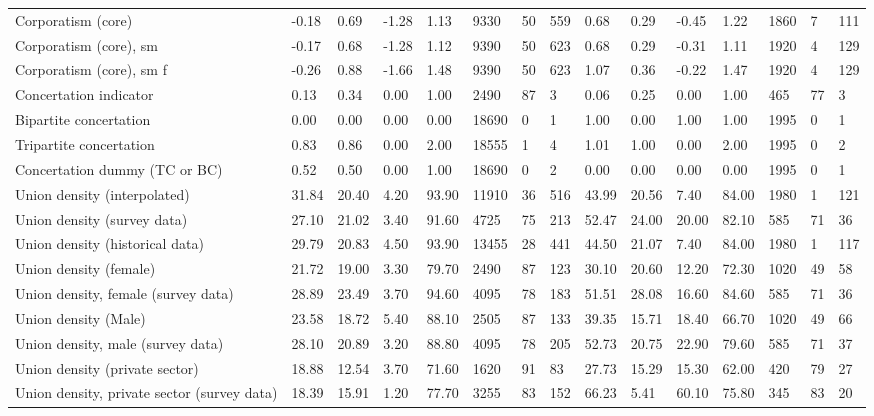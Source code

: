 \begin{longtable}{lllllllllllllll}
Corporatism (core) & -0.18 & 0.69 & -1.28 & 1.13 & 9330 & 50 & 559 & 0.68 & 0.29 & -0.45 & 1.22 & 1860 & 7 & 111\\
\addlinespace
Corporatism (core), sm & -0.17 & 0.68 & -1.28 & 1.12 & 9390 & 50 & 623 & 0.68 & 0.29 & -0.31 & 1.11 & 1920 & 4 & 129\\
Corporatism (core), sm f & -0.26 & 0.88 & -1.66 & 1.48 & 9390 & 50 & 623 & 1.07 & 0.36 & -0.22 & 1.47 & 1920 & 4 & 129\\
Concertation indicator & 0.13 & 0.34 & 0.00 & 1.00 & 2490 & 87 & 3 & 0.06 & 0.25 & 0.00 & 1.00 & 465 & 77 & 3\\
Bipartite concertation & 0.00 & 0.00 & 0.00 & 0.00 & 18690 & 0 & 1 & 1.00 & 0.00 & 1.00 & 1.00 & 1995 & 0 & 1\\
Tripartite concertation & 0.83 & 0.86 & 0.00 & 2.00 & 18555 & 1 & 4 & 1.01 & 1.00 & 0.00 & 2.00 & 1995 & 0 & 2\\
\addlinespace
Concertation dummy (TC or BC) & 0.52 & 0.50 & 0.00 & 1.00 & 18690 & 0 & 2 & 0.00 & 0.00 & 0.00 & 0.00 & 1995 & 0 & 1\\
Union density (interpolated) & 31.84 & 20.40 & 4.20 & 93.90 & 11910 & 36 & 516 & 43.99 & 20.56 & 7.40 & 84.00 & 1980 & 1 & 121\\
Union density (survey data) & 27.10 & 21.02 & 3.40 & 91.60 & 4725 & 75 & 213 & 52.47 & 24.00 & 20.00 & 82.10 & 585 & 71 & 36\\
Union density (historical data) & 29.79 & 20.83 & 4.50 & 93.90 & 13455 & 28 & 441 & 44.50 & 21.07 & 7.40 & 84.00 & 1980 & 1 & 117\\
Union density (female) & 21.72 & 19.00 & 3.30 & 79.70 & 2490 & 87 & 123 & 30.10 & 20.60 & 12.20 & 72.30 & 1020 & 49 & 58\\
\addlinespace
Union density, female (survey data) & 28.89 & 23.49 & 3.70 & 94.60 & 4095 & 78 & 183 & 51.51 & 28.08 & 16.60 & 84.60 & 585 & 71 & 36\\
Union density (Male) & 23.58 & 18.72 & 5.40 & 88.10 & 2505 & 87 & 133 & 39.35 & 15.71 & 18.40 & 66.70 & 1020 & 49 & 66\\
Union density, male (survey data) & 28.10 & 20.89 & 3.20 & 88.80 & 4095 & 78 & 205 & 52.73 & 20.75 & 22.90 & 79.60 & 585 & 71 & 37\\
Union density (private sector) & 18.88 & 12.54 & 3.70 & 71.60 & 1620 & 91 & 83 & 27.73 & 15.29 & 15.30 & 62.00 & 420 & 79 & 27\\
Union density, private sector (survey data) & 18.39 & 15.91 & 1.20 & 77.70 & 3255 & 83 & 152 & 66.23 & 5.41 & 60.10 & 75.80 & 345 & 83 & 20\\

\end{longtable}
